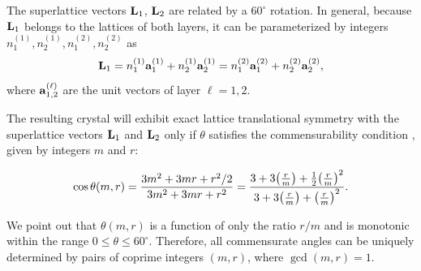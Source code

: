 The superlattice vectors $\vb{L}_1$, $\vb{L}_2$ are related by a $60^\circ$ rotation. In general, because $\vb{L}_1$ belongs to the lattices of both layers, it can be parameterized by integers $n_1^{(1)}, n_2^{(1)}, n_1^{(2)}, n_2^{(2)}$ as
\begin{equation} \label{eq:L1}
\vb{L}_1 = n_1^{(1)}\vb{a}_1^{(1)} + n_2^{(1)}\vb{a}_2^{(1)} = n_1^{(2)}\vb{a}_1^{(2)} + n_2^{(2)}\vb{a}_2^{(2)},
\end{equation}
where $\vb{a}_{1,2}^{(\ell)}$ are the unit vectors of layer $\ell = 1,2$.

The resulting crystal will exhibit exact lattice translational symmetry with the superlattice vectors \( \vb{L}_1 \) and \( \vb{L}_2 \) only if \( \theta \) satisfies the commensurability condition \cite{thesis_rennella, zou2018}, given by integers \( m \) and \( r \):

\begin{equation} \label{eq:costheta}
\cos\theta(m,r) = \frac{3m^2 + 3mr + r^2/2}{3m^2 + 3mr + r^2} = \frac{3 + 3 \qty(\frac{r}{m}) + \frac{1}{2} \qty(\frac{r}{m})^2}{3 + 3 \qty(\frac{r}{m}) + \qty(\frac{r}{m})^2}.
\end{equation}

We point out that \( \theta(m,r) \) is a function of only the ratio \( r/m \) and is monotonic within the range \( 0 \leq \theta \leq 60^\circ \). Therefore, all commensurate angles can be uniquely determined by pairs of coprime integers \( (m, r) \), where \( \gcd(m, r) = 1 \).

